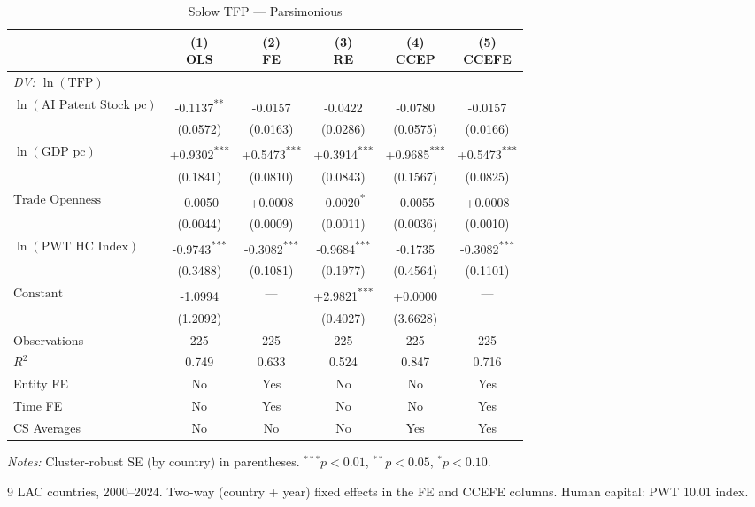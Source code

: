 \begin{table}[htbp]
\centering
\small
\caption{Solow TFP --- Parsimonious}
\label{tab:tab_solow_pars}
\begin{tabular}{lccccc}
\toprule
 & \makecell{(1)\\OLS} & \makecell{(2)\\FE} & \makecell{(3)\\RE} & \makecell{(4)\\CCEP} & \makecell{(5)\\CCEFE} \\
\midrule
\multicolumn{6}{l}{\textit{DV: $\ln(\text{TFP})$}} \\[4pt]
$\ln(\text{AI Patent Stock pc})$ & -0.1137\textsuperscript{**} & -0.0157\textsuperscript{} & -0.0422\textsuperscript{} & -0.0780\textsuperscript{} & -0.0157\textsuperscript{} \\
 & (0.0572) & (0.0163) & (0.0286) & (0.0575) & (0.0166) \\[2pt]
$\ln(\text{GDP pc})$ & +0.9302\textsuperscript{***} & +0.5473\textsuperscript{***} & +0.3914\textsuperscript{***} & +0.9685\textsuperscript{***} & +0.5473\textsuperscript{***} \\
 & (0.1841) & (0.0810) & (0.0843) & (0.1567) & (0.0825) \\[2pt]
$\text{Trade Openness}$ & -0.0050\textsuperscript{} & +0.0008\textsuperscript{} & -0.0020\textsuperscript{*} & -0.0055\textsuperscript{} & +0.0008\textsuperscript{} \\
 & (0.0044) & (0.0009) & (0.0011) & (0.0036) & (0.0010) \\[2pt]
$\ln(\text{PWT HC Index})$ & -0.9743\textsuperscript{***} & -0.3082\textsuperscript{***} & -0.9684\textsuperscript{***} & -0.1735\textsuperscript{} & -0.3082\textsuperscript{***} \\
 & (0.3488) & (0.1081) & (0.1977) & (0.4564) & (0.1101) \\[2pt]
$\text{Constant}$ & -1.0994\textsuperscript{} & --- & +2.9821\textsuperscript{***} & +0.0000\textsuperscript{} & --- \\
 & (1.2092) &  & (0.4027) & (3.6628) &  \\[2pt]
\midrule
Observations & 225 & 225 & 225 & 225 & 225 \\
$R^2$ & 0.749 & 0.633 & 0.524 & 0.847 & 0.716 \\
Entity FE & No & Yes & No & No & Yes \\
Time FE & No & Yes & No & No & Yes \\
CS Averages & No & No & No & Yes & Yes \\
\bottomrule
\end{tabular}
\begin{tablenotes}
\footnotesize
\item \textit{Notes:} Cluster-robust SE (by country) in parentheses. $^{***}p<0.01$, $^{**}p<0.05$, $^{*}p<0.10$.
\item 9 LAC countries, 2000--2024. Two-way (country + year) fixed effects in the FE and CCEFE columns. Human capital: PWT 10.01 index.
\end{tablenotes}
\end{table}